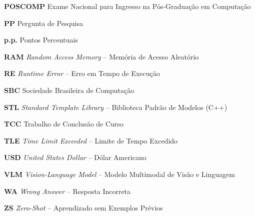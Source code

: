 \begin{description}
    \item \textbf{POSCOMP} \quad Exame Nacional para Ingresso na Pós-Graduação em Computação
    \item \textbf{PP} \quad Pergunta de Pesquisa
    \item \textbf{p.p.} \quad Pontos Percentuais
    \item \textbf{RAM} \quad \textit{Random Access Memory} -- Memória de Acesso Aleatório
    \item \textbf{RE} \quad \textit{Runtime Error} -- Erro em Tempo de Execução
    \item \textbf{SBC} \quad Sociedade Brasileira de Computação
    \item \textbf{STL} \quad \textit{Standard Template Library} -- Biblioteca Padrão de Modelos (C++)
    \item \textbf{TCC} \quad Trabalho de Conclusão de Curso
    \item \textbf{TLE} \quad \textit{Time Limit Exceeded} -- Limite de Tempo Excedido
    \item \textbf{USD} \quad \textit{United States Dollar} -- Dólar Americano
    \item \textbf{VLM} \quad \textit{Vision-Language Model} -- Modelo Multimodal de Visão e Linguagem
    \item \textbf{WA} \quad \textit{Wrong Answer} -- Resposta Incorreta
    \item \textbf{ZS} \quad \textit{Zero-Shot} -- Aprendizado sem Exemplos Prévios
\end{description}
